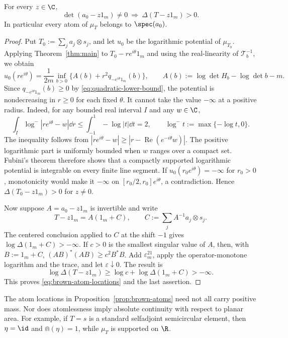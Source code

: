 \begin{proposition}\label{prop:brown-atoms}
For every $z\in\C$,
\begin{equation}\label{eq:brown-atom-locations}
 \det(a_0-z1_m)\ne0\ \Longrightarrow\ \Delta(T-z1_m)>0.
\end{equation}
In particular every atom of $\mu_T$ belongs to $\spec(a_0)$.
\end{proposition}
\begin{proof}
Put $T_0:=\sum_j a_j\otimes s_j$, and let $u_0$ be the logarithmic potential of $\mu_{T_0}$.
Applying Theorem~\ref{thm:main} to $T_0-re^{i\theta}1_m$ and using the real-linearity of $\mathcal T_b^{-1}$, we obtain
\begin{equation}\label{eq:brown-ray-monotonicity}
 u_0(re^{i\theta})=\frac1{2m}\inf_{b>0}
 \{A(b)+r^2q_{-e^{i\theta}1_m}(b)\},\qquad
 A(b):=\log\det H_b-\log\det b-m.
\end{equation}
Since $q_{-e^{i\theta}1_m}(b)\ge0$ by \eqref{eq:quadratic-lower-bound}, the potential is nondecreasing in $r\ge0$ for each fixed $\theta$.
It cannot take the value $-\infty$ at a positive radius.
Indeed, for any bounded real interval $I$ and any $w\in\C$,
\[
 \int_I\log^-|re^{i\theta}-w|\dd r
 \le\int_{-1}^1-\log|t|\dd t=2,
 \qquad \log^-t:=\max\{-\log t,0\}.
\]
The inequality follows from $|re^{i\theta}-w|\ge|r-\operatorname{Re}(e^{-i\theta}w)|$.
The positive logarithmic part is uniformly bounded when $w$ ranges over a compact set.
Fubini's theorem therefore shows that a compactly supported logarithmic potential is integrable on every finite line segment.
If $u_0(r_0e^{i\theta})=-\infty$ for $r_0>0$, monotonicity would make it $-\infty$ on $[r_0/2,r_0]e^{i\theta}$, a contradiction.
Hence $\Delta(T_0-z1_m)>0$ for $z\ne0$.

Now suppose $A=a_0-z1_m$ is invertible and write
\[
 T-z1_m=A(1_m+C),\qquad
 C:=\sum_j A^{-1}a_j\otimes s_j.
\]
The centered conclusion applied to $C$ at the shift $-1$ gives $\log\Delta(1_m+C)>-\infty$.
If $c>0$ is the smallest singular value of $A$, then, with $B:=1_m+C$, $(AB)^*(AB)\ge c^2B^*B$.
Add $\varepsilon^21_m$, apply the operator-monotone logarithm and the trace, and let $\varepsilon\downarrow0$.
The result is
\[
 \log\Delta(T-z1_m)\ge\log c+\log\Delta(1_m+C)>-\infty.
\]
This proves \eqref{eq:brown-atom-locations} and the last assertion.
\end{proof}

The atom locations in Proposition~\ref{prop:brown-atoms} need not all carry positive mass.
Nor does atomlessness imply absolute continuity with respect to planar area.
For example, if $T=s$ is a standard selfadjoint semicircular element, then $\eta=\id$ and $\Cap(\eta)=1$, while $\mu_T$ is supported on $\R$.

